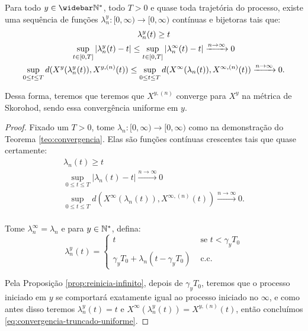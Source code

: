 \begin{corolario}
  \label{cor:convergencia}
  Para todo $y \in \Nzb$, todo $T > 0$ e quase toda trajetória do
  processo, existe uma sequência de funções $\lambda^y_n: [0, \infty) \to
  [0, \infty)$ contínuas  e bijetoras tais que:
  \begin{gather}
    \label{eq:convergencia-truncado-uniforme}
    \lambda^y_n(t) \geq t \\
    \sup_{t \in [0, T]} |\lambda^y_n(t) - t| \leq
    \sup_{t \in [0, T]} |\lambda^\infty_n(t) - t|
    \xrightarrow{n \to \infty} 0 \notag\\
    \sup_{0 \leq t \leq T} d(X^y(\lambda_n^y(t)), X^{y, (n)}(t)) \leq
    \sup_{0 \leq t \leq T} d(X^\infty(\lambda_n(t)), X^{\infty, (n)}(t))
    \xrightarrow{n\to\infty} 0. \notag
  \end{gather}
  
  Dessa forma, teremos que teremos que $X^{y, (n)}$ converge \qc para
  $X^y$ na métrica de Skorohod, sendo essa convergência uniforme em
  $y$.
\end{corolario}
\begin{proof}
  Fixado um $T > 0$, tome $\lambda_n: [0, \infty) \to [0, \infty)$
  como na demonstração do Teorema \ref{teo:convergencia}. Elas são
  funções contínuas crescentes tais que quase certamente:
  \begin{gather*}
    \lambda_n(t) \geq t\\
    \sup_{0 \leq t \leq T} |\lambda_n(t) - t|
    \xrightarrow{n\to\infty} 0 \\
    \sup_{0 \leq t \leq T} d(X^\infty(\lambda_n(t)), X^{\infty, (n)}(t))
    \xrightarrow{n\to\infty} 0. \\
  \end{gather*}

  Tome $\lambda^\infty_n = \lambda_n$ e para $y \in {\mathbb{N^*}}$, defina:
  \begin{displaymath}
    \lambda_n^y(t) = \begin{cases}
      t & \textrm{ se } t < \gamma_y T_0\\
      \gamma_yT_0 + \lambda_n(t - \gamma_y T_0) & \textrm{ c.c.}
    \end{cases}
  \end{displaymath}


  Pela Proposição \ref{prop:reinicia-infinito}, depois de $\gamma_y
  T_0$, teremos que o processo iniciado em $y$ se comportará
  exatamente igual ao processo iniciado no $\infty$, e como antes
  disso teremos $\lambda^y_n(t) = t$ e $X^\infty(\lambda_n^y(t)) = X^{y,
    (n)}(t)$, então concluímos
  \eqref{eq:convergencia-truncado-uniforme}.
\end{proof}


